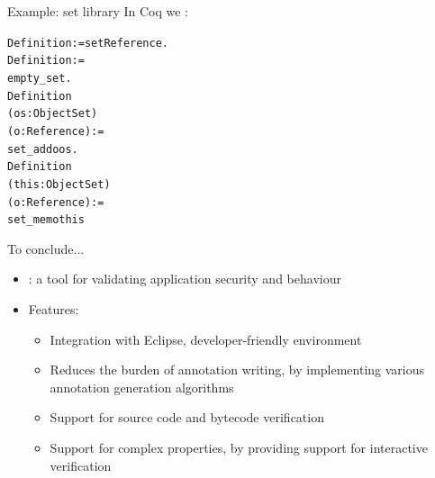 \documentclass[final,nocolorBG,a4,mobius,nototal,pdf,slideColor]{prosper}
\begin{document}
\begin{slide}{Example: set library}
In Coq we :
\begin{alltt}
Definition  := set Reference. 
Definition  := 
                     empty\_set.
Definition  
                     (os: ObjectSet) 
                     (o: Reference) :=  
                     set\_add o os.
Definition  
                     (this: ObjectSet) 
                     (o: Reference) := 
                     set\_mem o this
\end{alltt}
\end{slide}

\begin{slide}{To conclude...}
\begin{itemize}
\item {}: a tool for validating application security and behaviour
\item Features:
\begin{itemize}
\item Integration with Eclipse, developer-friendly environment
\item Reduces the burden of annotation writing, by implementing
various annotation generation algorithms
\item Support for source code and bytecode verification
\item Support for complex properties, by providing support for
interactive verification
\end{itemize}

\end{itemize}
\end{slide}
\end{document}
